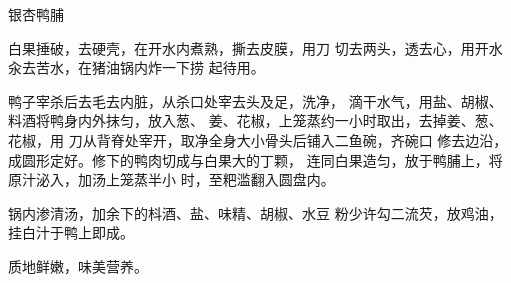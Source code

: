 \begin{recipe}{银杏鸭脯}

\ingredients



\cooking

\step 	白果捶破，去硬壳，在开水内煮熟，撕去皮膜，用刀 切去两头，透去心，用开水汆去苦水，在猪油锅内炸一下捞 起待用。

\step 	鸭子宰杀后去毛去内脏，从杀口处宰去头及足，洗净， 滴干水气，用盐、胡椒、料酒将鸭身内外抹匀，放入葱、 姜、花椒，上笼蒸约一小时取出，去掉姜、葱、花椒，用 刀从背脊处宰开，取净全身大小骨头后铺入二鱼碗，齐碗口 修去边沿，成圆形定好。修下的鸭肉切成与白果大的丁颗， 连同白果造匀，放于鸭脯上，将原汁泌入，加汤上笼蒸半小 时，至粑滥翻入圆盘内。

\step 	锅内渗清汤，加余下的枓酒、盐、味精、胡椒、水豆 粉少许勾二流芡，放鸡油，挂白汁于鸭上即成。

\notes

质地鲜嫩，味美营养。

\end{recipe}

